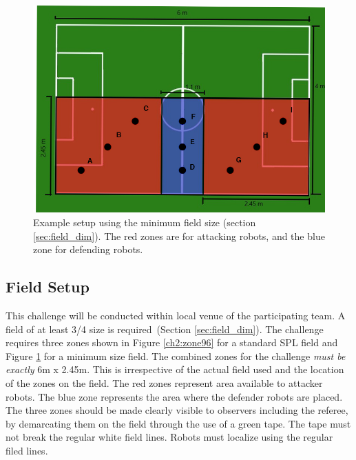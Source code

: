 \begin{figure}[ht]
\includegraphics[width=0.95\linewidth]{figs/ch_2_reduced.jpg}
\caption{Example setup using the minimum field size (\cf section \ref{sec:field_dim}). The red zones are for attacking robots, and the blue zone for defending robots.
}
\label{ch2:zone64}
\centering
\end{figure}


\subsection{Field Setup}
This challenge will be conducted within local venue of the participating team. A field of at least 3/4 size is required~(\cf Section \ref{sec:field_dim}). 
The challenge requires three zones shown in Figure \ref{ch2:zone96} for a standard SPL field and Figure \ref{ch2:zone64} for a minimum size field. The combined zones for the challenge \textit{must be exactly} 6m x 2.45m. This is irrespective of the actual field used and the location of the zones on the field.
The red zones represent area available to attacker robots. The blue zone represents the area where the defender robots are placed.
The three zones should be made clearly visible to observers including the referee, by demarcating them on the field through the use of a green tape. The tape must not break the regular white field lines.
Robots must localize using the regular filed lines.


